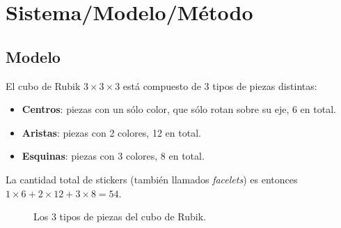 \chapter{Sistema/Modelo/Método}

\section{Modelo}
El cubo de Rubik $3 \times 3 \times 3$ está compuesto de 3 tipos de piezas distintas:
\begin{itemize}
	\item \textbf{Centros}: piezas con un sólo color, que sólo rotan sobre su eje, 6 en total.
	\item \textbf{Aristas}: piezas con 2 colores, 12 en total.
	\item \textbf{Esquinas}: piezas con 3 colores, 8 en total.
\end{itemize}
La cantidad total de stickers (también llamados \textit{facelets}) es entonces $1\times 6 + 2\times 12 + 3\times 8 = 54$.
\begin{figure}[h!]
	\centering
	\hfill
	\hfill
	\caption{Los 3 tipos de piezas del cubo de Rubik.}
\end{figure}

